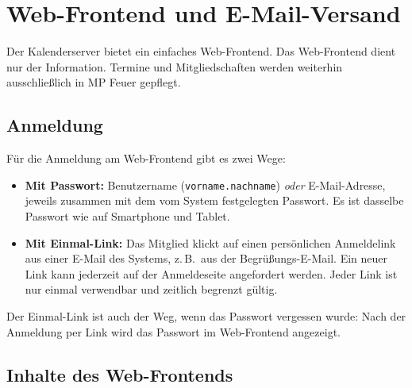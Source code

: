 \documentclass[a4paper,fontsize=10pt]{scrartcl}
\begin{document}
\section{Web-Frontend und E-Mail-Versand}\label{sec:web}

Der Kalenderserver bietet ein einfaches Web-Frontend. Das Web-Frontend dient
nur der Information. Termine und Mitgliedschaften werden
weiterhin ausschließlich in MP Feuer gepflegt.

\subsection*{Anmeldung}

Für die Anmeldung am Web-Frontend gibt es zwei Wege:

\begin{itemize}
  \item \textbf{Mit Passwort:} Benutzername (\texttt{vorname.nachname})
        \emph{oder} E-Mail-Adresse, jeweils zusammen mit dem vom System
        festgelegten Passwort. Es ist dasselbe Passwort wie auf Smartphone
        und Tablet.
  \item \textbf{Mit Einmal-Link:} Das Mitglied klickt auf einen persönlichen
        Anmeldelink aus einer E-Mail des Systems, z.\,B.\ aus der
        Begrüßungs-E-Mail. Ein neuer Link kann jederzeit auf der Anmeldeseite
        angefordert werden. Jeder Link ist nur einmal verwendbar und zeitlich
        begrenzt gültig.
\end{itemize}

Der Einmal-Link ist auch der Weg, wenn das Passwort vergessen wurde: Nach der
Anmeldung per Link wird das Passwort im Web-Frontend angezeigt.

\subsection*{Inhalte des Web-Frontends}
\end{document}
